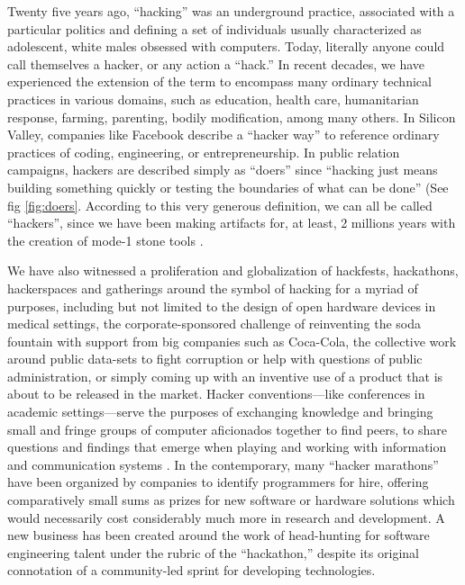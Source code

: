 \documentclass[10pt,letter,oneside]{scrartcl}
\begin{document}
Twenty five years ago, ``hacking'' was an underground practice,
associated with a particular politics and defining a set of individuals usually
characterized as adolescent, white males obsessed with computers.  Today,
literally anyone could call themselves a hacker, or any action a ``hack.'' In
recent decades, we have experienced the extension of the term to encompass many
ordinary technical practices in various domains, such as education, health care,
humanitarian response, farming, parenting, bodily modification, among many
others.  In Silicon Valley, companies like Facebook describe a ``hacker way'' to
reference ordinary practices of coding, engineering, or entrepreneurship.  In
public relation campaigns, hackers are described simply as ``doers'' since
``hacking just means building something quickly or testing the boundaries of
what can be done'' (See fig \ref{fig:doers}. According to this very generous
definition, we can all be called ``hackers'', since we have been making
artifacts for, at least, 2 millions years with the creation of mode-1 stone
tools \autocite{clark_world_1961}.

We have also witnessed a proliferation and globalization of hackfests,
hackathons, hackerspaces and gatherings around the symbol of hacking for a
myriad of purposes, including but not limited to the design of open hardware
devices in medical settings, the corporate-sponsored challenge of reinventing
the soda fountain with support from big companies such as Coca-Cola, the
collective work around public data-sets to fight corruption or help with
questions of public administration, or simply coming up with an inventive use of
a product that is about to be released in the market.  Hacker conventions---like
conferences in academic settings---serve the purposes of exchanging knowledge
and bringing small and fringe groups of computer aficionados together to find
peers, to share questions and findings that emerge when playing and working with
information and communication systems \autocite{coleman_conference_2010}.  In
the contemporary, many ``hacker marathons'' have been organized by companies to
identify programmers for hire, offering comparatively small sums as prizes for
new software or hardware solutions which would necessarily cost considerably
much more in research and development.  A new business has been created around
the work of head-hunting for software engineering talent under the rubric of the
``hackathon,'' despite its original connotation of a community-led sprint for
developing technologies.
\end{document}
